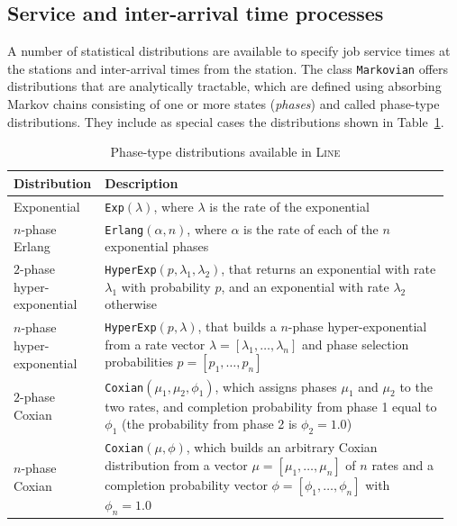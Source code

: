 \subsection{Service and inter-arrival time processes}
\label{service-and-inter-arrival-time-processes}
A number of statistical distributions are available to specify job service times at the stations and inter-arrival times from the  station. The class \texttt{Markovian} offers distributions that are analytically tractable, which are defined using absorbing Markov chains consisting of one or more states ({\em phases}) and called phase-type distributions. They include as special cases the distributions shown in Table~\ref{tab:phasetype-dist}.

\begin{table}[t!]
\renewcommand{\arraystretch}{1.2}
\centering
\caption{Phase-type distributions available in \textsc{Line}}
\label{tab:phasetype-dist}
{\small
\begin{tabular}{|p{0.18\linewidth}|p{0.78\linewidth}|}
\hline
\textbf{Distribution} & \textbf{Description} \\
\hline
Exponential & \texttt{Exp}$(\lambda)$, where $\lambda$ is the rate of the exponential \\
\hline
$n$-phase Erlang\index{Erlang distribution|see{Network models}} & \texttt{Erlang}$(\alpha, n)$, where $\alpha$ is the rate of each of the $n$ exponential phases \\
\hline
$2$-phase hyper-exponential\index{Hyperexponential|see{Network models}} & \texttt{HyperExp}$(p,\lambda_1,\lambda_2)$, that returns an exponential with rate $\lambda_1$ with probability $p$, and an exponential with rate $\lambda_2$ otherwise \\
\hline
$n$-phase hyper-exponential & \texttt{HyperExp}$(p,\lambda)$, that builds a $n$-phase hyper-exponential from a rate vector $\lambda=[\lambda_1,\ldots,\lambda_n]$ and phase selection probabilities $p=[p_1,\ldots,p_n]$ \\
\hline
$2$-phase Coxian\index{Cox distribution|see{Network models}} & \texttt{Coxian}$(\mu_1,\mu_2,\phi_1)$, which assigns phases $\mu_1$ and $\mu_2$ to the two rates, and completion probability from phase 1 equal to $\phi_1$ (the probability from phase 2 is $\phi_2=1.0$) \\
\hline
$n$-phase Coxian & \texttt{Coxian}$(\mu,\phi)$, which builds an arbitrary Coxian distribution from a vector $\mu=[\mu_1,\ldots,\mu_n]$ of $n$ rates and a completion probability vector $\phi=[\phi_1,\ldots,\phi_n]$ with $\phi_n=1.0$ \\

\end{tabular}}
\end{table}
